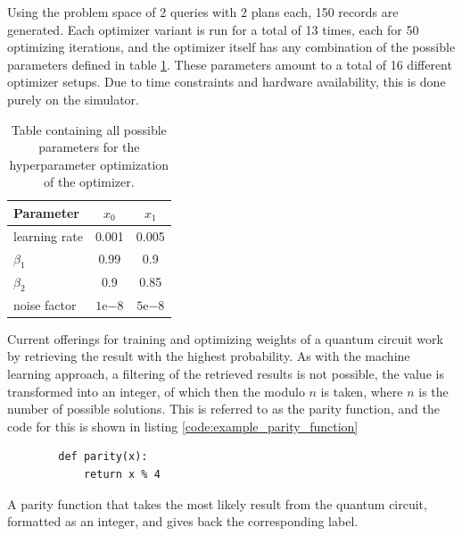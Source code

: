\newpage

Using the problem space of 2 queries with 2 plans each, 150 records are generated. Each optimizer variant is run for a total of 13 times, each for 50 optimizing iterations, and the optimizer itself has any combination of the possible parameters defined in table \ref{table:hyperparameter_options}. These parameters amount to a total of 16 different optimizer setups. Due to time constraints and hardware availability, this is done purely on the simulator.

\begin{table}[!h]
    \centering
    \begin{tabular}{|l|c|c|}
    \hline
    Parameter     & $x_0$             & $x_1$             \\ \hline
    learning rate & 0.001             & 0.005             \\ \hline
    $\beta_1$     & 0.99              & 0.9               \\ \hline
    $\beta_2$     & 0.9               & 0.85              \\ \hline
    noise factor  & $1\mathrm{e}{-8}$ & $5\mathrm{e}{-8}$ \\ \hline
    \end{tabular}
    \caption{Table containing all possible parameters for the hyperparameter optimization of the  optimizer.}
    \label{table:hyperparameter_options}
\end{table}

Current offerings for training and optimizing weights of a quantum circuit work by retrieving the result with the highest probability. As with the machine learning approach, a filtering of the retrieved results is not possible, the value is transformed into an integer, of which then the modulo $n$ is taken, where $n$ is the number of possible solutions. This is referred to as the parity function, and the code for this is shown in listing \ref{code:example_parity_function}

\begin{listing}[!h]
    \centering
    \begin{verbatim}
        def parity(x):
            return x % 4
    \end{verbatim}
    \caption{A parity function that takes the most likely result from the quantum circuit, formatted as an integer, and gives back the corresponding label.}
    \label{code:example_parity_function}
\end{listing}

